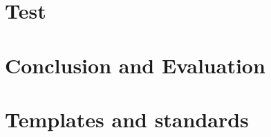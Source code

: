 \documentclass[11pt, a4paper]{article}
\begin{document}
\newpage
\section{Test}

\clearpage

\clearpage

\clearpage

\clearpage


\newpage
\section{Conclusion and Evaluation}




\newpage
\section{Templates and standards}



\newpage

\end{document}
